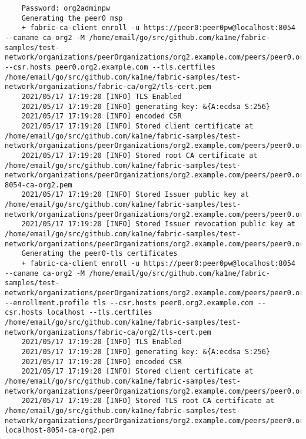 \begin{lstlisting}
    Password: org2adminpw
    Generating the peer0 msp
    + fabric-ca-client enroll -u https://peer0:peer0pw@localhost:8054 --caname ca-org2 -M /home/email/go/src/github.com/ka1ne/fabric-samples/test-network/organizations/peerOrganizations/org2.example.com/peers/peer0.org2.example.com/msp --csr.hosts peer0.org2.example.com --tls.certfiles /home/email/go/src/github.com/ka1ne/fabric-samples/test-network/organizations/fabric-ca/org2/tls-cert.pem
    2021/05/17 17:19:20 [INFO] TLS Enabled
    2021/05/17 17:19:20 [INFO] generating key: &{A:ecdsa S:256}
    2021/05/17 17:19:20 [INFO] encoded CSR
    2021/05/17 17:19:20 [INFO] Stored client certificate at /home/email/go/src/github.com/ka1ne/fabric-samples/test-network/organizations/peerOrganizations/org2.example.com/peers/peer0.org2.example.com/msp/signcerts/cert.pem
    2021/05/17 17:19:20 [INFO] Stored root CA certificate at /home/email/go/src/github.com/ka1ne/fabric-samples/test-network/organizations/peerOrganizations/org2.example.com/peers/peer0.org2.example.com/msp/cacerts/localhost-8054-ca-org2.pem
    2021/05/17 17:19:20 [INFO] Stored Issuer public key at /home/email/go/src/github.com/ka1ne/fabric-samples/test-network/organizations/peerOrganizations/org2.example.com/peers/peer0.org2.example.com/msp/IssuerPublicKey
    2021/05/17 17:19:20 [INFO] Stored Issuer revocation public key at /home/email/go/src/github.com/ka1ne/fabric-samples/test-network/organizations/peerOrganizations/org2.example.com/peers/peer0.org2.example.com/msp/IssuerRevocationPublicKey
    Generating the peer0-tls certificates
    + fabric-ca-client enroll -u https://peer0:peer0pw@localhost:8054 --caname ca-org2 -M /home/email/go/src/github.com/ka1ne/fabric-samples/test-network/organizations/peerOrganizations/org2.example.com/peers/peer0.org2.example.com/tls --enrollment.profile tls --csr.hosts peer0.org2.example.com --csr.hosts localhost --tls.certfiles /home/email/go/src/github.com/ka1ne/fabric-samples/test-network/organizations/fabric-ca/org2/tls-cert.pem
    2021/05/17 17:19:20 [INFO] TLS Enabled
    2021/05/17 17:19:20 [INFO] generating key: &{A:ecdsa S:256}
    2021/05/17 17:19:20 [INFO] encoded CSR
    2021/05/17 17:19:20 [INFO] Stored client certificate at /home/email/go/src/github.com/ka1ne/fabric-samples/test-network/organizations/peerOrganizations/org2.example.com/peers/peer0.org2.example.com/tls/signcerts/cert.pem
    2021/05/17 17:19:20 [INFO] Stored TLS root CA certificate at /home/email/go/src/github.com/ka1ne/fabric-samples/test-network/organizations/peerOrganizations/org2.example.com/peers/peer0.org2.example.com/tls/tlscacerts/tls-localhost-8054-ca-org2.pem

\end{lstlisting}
